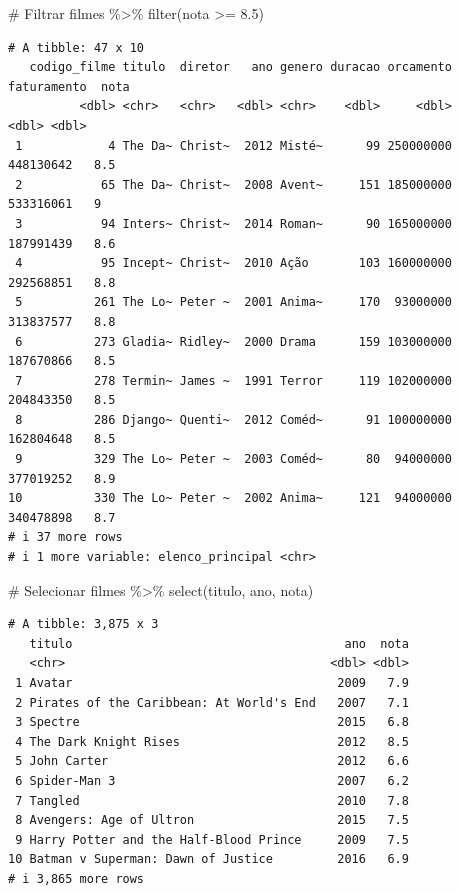 \documentclass[
  letterpaper,
]{scrbook}
\newenvironment{Shaded}{\begin{snugshade}}{\end{snugshade}}
\newcommand{\CommentTok}[1]{\textcolor[rgb]{0.37,0.37,0.37}{#1}}
\newcommand{\FloatTok}[1]{\textcolor[rgb]{0.68,0.00,0.00}{#1}}
\newcommand{\FunctionTok}[1]{\textcolor[rgb]{0.28,0.35,0.67}{#1}}
\newcommand{\NormalTok}[1]{\textcolor[rgb]{0.00,0.23,0.31}{#1}}
\newcommand{\SpecialCharTok}[1]{\textcolor[rgb]{0.37,0.37,0.37}{#1}}
\begin{document}
\begin{Shaded}
\begin{Highlighting}[]
\CommentTok{\# Filtrar}
\NormalTok{filmes }\SpecialCharTok{\%\textgreater{}\%} \FunctionTok{filter}\NormalTok{(nota }\SpecialCharTok{\textgreater{}=} \FloatTok{8.5}\NormalTok{)}
\end{Highlighting}
\end{Shaded}

\begin{verbatim}
# A tibble: 47 x 10
   codigo_filme titulo  diretor   ano genero duracao orcamento faturamento  nota
          <dbl> <chr>   <chr>   <dbl> <chr>    <dbl>     <dbl>       <dbl> <dbl>
 1            4 The Da~ Christ~  2012 Misté~      99 250000000   448130642   8.5
 2           65 The Da~ Christ~  2008 Avent~     151 185000000   533316061   9  
 3           94 Inters~ Christ~  2014 Roman~      90 165000000   187991439   8.6
 4           95 Incept~ Christ~  2010 Ação       103 160000000   292568851   8.8
 5          261 The Lo~ Peter ~  2001 Anima~     170  93000000   313837577   8.8
 6          273 Gladia~ Ridley~  2000 Drama      159 103000000   187670866   8.5
 7          278 Termin~ James ~  1991 Terror     119 102000000   204843350   8.5
 8          286 Django~ Quenti~  2012 Coméd~      91 100000000   162804648   8.5
 9          329 The Lo~ Peter ~  2003 Coméd~      80  94000000   377019252   8.9
10          330 The Lo~ Peter ~  2002 Anima~     121  94000000   340478898   8.7
# i 37 more rows
# i 1 more variable: elenco_principal <chr>
\end{verbatim}

\begin{Shaded}
\begin{Highlighting}[]
\CommentTok{\# Selecionar}
\NormalTok{filmes }\SpecialCharTok{\%\textgreater{}\%} \FunctionTok{select}\NormalTok{(titulo, ano, nota)}
\end{Highlighting}
\end{Shaded}

\begin{verbatim}
# A tibble: 3,875 x 3
   titulo                                      ano  nota
   <chr>                                     <dbl> <dbl>
 1 Avatar                                     2009   7.9
 2 Pirates of the Caribbean: At World's End   2007   7.1
 3 Spectre                                    2015   6.8
 4 The Dark Knight Rises                      2012   8.5
 5 John Carter                                2012   6.6
 6 Spider-Man 3                               2007   6.2
 7 Tangled                                    2010   7.8
 8 Avengers: Age of Ultron                    2015   7.5
 9 Harry Potter and the Half-Blood Prince     2009   7.5
10 Batman v Superman: Dawn of Justice         2016   6.9
# i 3,865 more rows
\end{verbatim}
\end{document}
